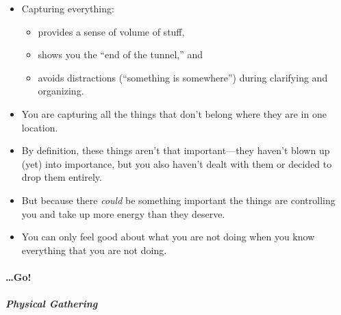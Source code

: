 \documentclass{article}
\begin{document}
\begin{itemize}
  \item Capturing everything:
  \begin{itemize}
    \item provides a sense of volume of stuff,
    \item  shows you the ``end of the tunnel,'' and
    \item avoids distractions (``something is somewhere'') during clarifying and organizing.
  \end{itemize}
  \item You are capturing all the things that don't belong where they are in one location.
  \item By definition, these things aren't that important---they haven't blown up (yet) into importance, but you also haven't dealt with them or decided to drop them entirely.
  \item But because there \emph{could} be something important the things are controlling you and take up more energy than they deserve.
  \item You can only feel good about what you are not doing when you know everything that you are not doing.
\end{itemize}

\paragraph{\ldots Go!}

\subparagraph{Physical Gathering}
\end{document}
